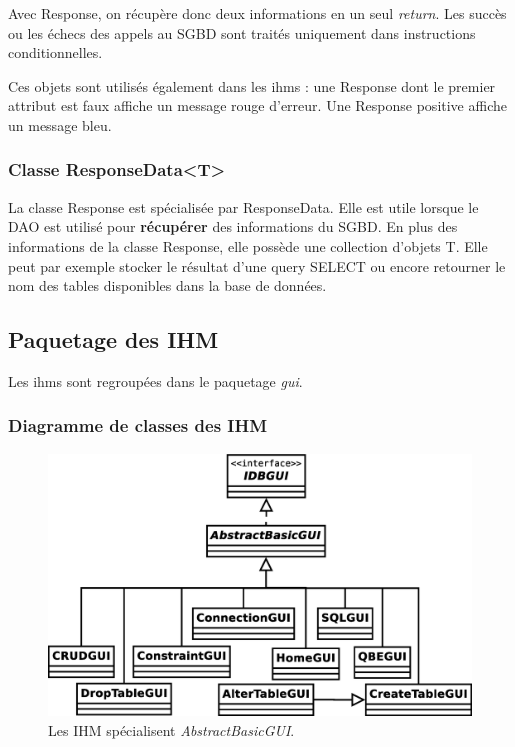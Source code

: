 Avec Response, on récupère donc deux informations en un seul \textit{return}.
Les succès ou les échecs des appels au SGBD sont traités uniquement dans instructions conditionnelles.

Ces objets sont utilisés également dans les \glspl{ihm} : une Response dont le premier attribut est faux affiche un message rouge d'erreur.
Une Response positive affiche un message bleu.

\subsubsection{Classe ResponseData<T>}
La classe Response est spécialisée par ResponseData.
Elle est utile lorsque le DAO est utilisé pour \textbf{récupérer} des informations du SGBD.
En plus des informations de la classe Response, elle possède une collection d'objets T.
Elle peut par exemple stocker le résultat d'une \gls{query} SELECT ou encore retourner le nom des tables disponibles dans la base de données.

\subsection{Paquetage des IHM}
Les \glspl{ihm} sont regroupées dans le paquetage \textit{gui}.

\subsubsection{Diagramme de classes des IHM}
\begin{figure}[!h]
\centering
\includegraphics[width=14cm]{images/gui.eps}
\caption{Les IHM spécialisent \textit{AbstractBasicGUI}.}
\label{hierarchie_des_ihm}
\end{figure}

